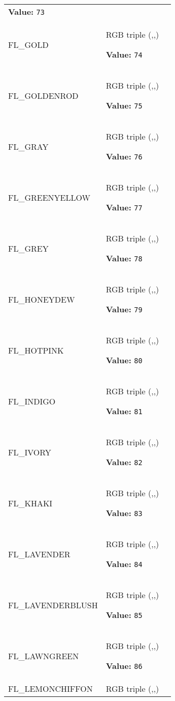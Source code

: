 \begin{longtable}{|p{\varnamewidth}|p{\vardescrwidth}|l}
\textbf{Value:} 
{\tt 73}&\\
\cline{1-2}
\raggedright F\-L\-\_\-G\-O\-L\-D\- & \raggedright RGB triple (,,)

\textbf{Value:} 
{\tt 74}&\\
\cline{1-2}
\raggedright F\-L\-\_\-G\-O\-L\-D\-E\-N\-R\-O\-D\- & \raggedright RGB triple (,,)

\textbf{Value:} 
{\tt 75}&\\
\cline{1-2}
\raggedright F\-L\-\_\-G\-R\-A\-Y\- & \raggedright RGB triple (,,)

\textbf{Value:} 
{\tt 76}&\\
\cline{1-2}
\raggedright F\-L\-\_\-G\-R\-E\-E\-N\-Y\-E\-L\-L\-O\-W\- & \raggedright RGB triple (,,)

\textbf{Value:} 
{\tt 77}&\\
\cline{1-2}
\raggedright F\-L\-\_\-G\-R\-E\-Y\- & \raggedright RGB triple (,,)

\textbf{Value:} 
{\tt 78}&\\
\cline{1-2}
\raggedright F\-L\-\_\-H\-O\-N\-E\-Y\-D\-E\-W\- & \raggedright RGB triple (,,)

\textbf{Value:} 
{\tt 79}&\\
\cline{1-2}
\raggedright F\-L\-\_\-H\-O\-T\-P\-I\-N\-K\- & \raggedright RGB triple (,,)

\textbf{Value:} 
{\tt 80}&\\
\cline{1-2}
\raggedright F\-L\-\_\-I\-N\-D\-I\-G\-O\- & \raggedright RGB triple (,,)

\textbf{Value:} 
{\tt 81}&\\
\cline{1-2}
\raggedright F\-L\-\_\-I\-V\-O\-R\-Y\- & \raggedright RGB triple (,,)

\textbf{Value:} 
{\tt 82}&\\
\cline{1-2}
\raggedright F\-L\-\_\-K\-H\-A\-K\-I\- & \raggedright RGB triple (,,)

\textbf{Value:} 
{\tt 83}&\\
\cline{1-2}
\raggedright F\-L\-\_\-L\-A\-V\-E\-N\-D\-E\-R\- & \raggedright RGB triple (,,)

\textbf{Value:} 
{\tt 84}&\\
\cline{1-2}
\raggedright F\-L\-\_\-L\-A\-V\-E\-N\-D\-E\-R\-B\-L\-U\-S\-H\- & \raggedright RGB triple (,,)

\textbf{Value:} 
{\tt 85}&\\
\cline{1-2}
\raggedright F\-L\-\_\-L\-A\-W\-N\-G\-R\-E\-E\-N\- & \raggedright RGB triple (,,)

\textbf{Value:} 
{\tt 86}&\\
\cline{1-2}
\raggedright F\-L\-\_\-L\-E\-M\-O\-N\-C\-H\-I\-F\-F\-O\-N\- & \raggedright RGB triple (,,)


\end{longtable}
